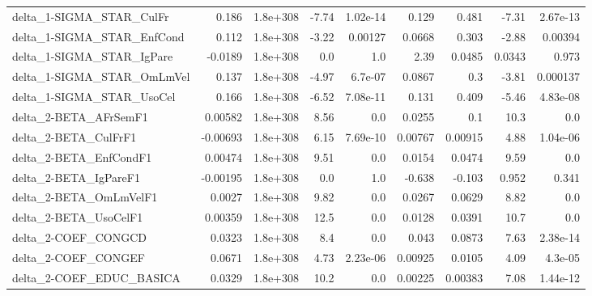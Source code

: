 \begin{tabular}{lrrrrrrrr}
delta\_1-SIGMA\_STAR\_CulFr              &       0.186 &     1.8e+308 &    -7.74 & 1.02e-14 &      0.129 &       0.481 &        -7.31 &      2.67e-13 \\
delta\_1-SIGMA\_STAR\_EnfCond            &       0.112 &     1.8e+308 &    -3.22 &  0.00127 &     0.0668 &       0.303 &        -2.88 &       0.00394 \\
delta\_1-SIGMA\_STAR\_IgPare             &     -0.0189 &     1.8e+308 &      0.0 &      1.0 &       2.39 &      0.0485 &       0.0343 &         0.973 \\
delta\_1-SIGMA\_STAR\_OmLmVel            &       0.137 &     1.8e+308 &    -4.97 &  6.7e-07 &     0.0867 &         0.3 &        -3.81 &      0.000137 \\
delta\_1-SIGMA\_STAR\_UsoCel             &       0.166 &     1.8e+308 &    -6.52 & 7.08e-11 &      0.131 &       0.409 &        -5.46 &      4.83e-08 \\
delta\_2-BETA\_AFrSemF1                 &     0.00582 &     1.8e+308 &     8.56 &      0.0 &     0.0255 &         0.1 &         10.3 &           0.0 \\
delta\_2-BETA\_CulFrF1                  &    -0.00693 &     1.8e+308 &     6.15 & 7.69e-10 &    0.00767 &     0.00915 &         4.88 &      1.04e-06 \\
delta\_2-BETA\_EnfCondF1                &     0.00474 &     1.8e+308 &     9.51 &      0.0 &     0.0154 &      0.0474 &         9.59 &           0.0 \\
delta\_2-BETA\_IgPareF1                 &    -0.00195 &     1.8e+308 &      0.0 &      1.0 &     -0.638 &      -0.103 &        0.952 &         0.341 \\
delta\_2-BETA\_OmLmVelF1                &      0.0027 &     1.8e+308 &     9.82 &      0.0 &     0.0267 &      0.0629 &         8.82 &           0.0 \\
delta\_2-BETA\_UsoCelF1                 &     0.00359 &     1.8e+308 &     12.5 &      0.0 &     0.0128 &      0.0391 &         10.7 &           0.0 \\
delta\_2-COEF\_CONGCD                   &      0.0323 &     1.8e+308 &      8.4 &      0.0 &      0.043 &      0.0873 &         7.63 &      2.38e-14 \\
delta\_2-COEF\_CONGEF                   &      0.0671 &     1.8e+308 &     4.73 & 2.23e-06 &    0.00925 &      0.0105 &         4.09 &       4.3e-05 \\
delta\_2-COEF\_EDUC\_BASICA              &      0.0329 &     1.8e+308 &     10.2 &      0.0 &    0.00225 &     0.00383 &         7.08 &      1.44e-12 \\

\end{tabular}
